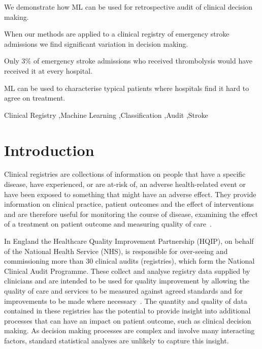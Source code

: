 \documentclass[12pt,a4paper, pdftex]{elsarticle}
\begin{document}
\begin{frontmatter}
\begin{highlights}
\item We demonstrate how ML can be used for retrospective audit of clinical decision making.
\item When our methods are applied to a clinical registry of emergency stroke admissions we find significant variation in decision making.
\item Only 3\% of emergency stroke admissions who received thrombolysis would have received it at every hospital.
\item ML can be used to characterise typical patients where hospitals find it hard to agree on treatment.
\end{highlights}

\begin{keyword}

Clinical Registry \sep Machine Learning \sep Classification \sep Audit \sep Stroke

\end{keyword}

\end{frontmatter}



\section{Introduction}

Clinical registries are collections of information on people that have a specific disease, have experienced, or are at-risk of, an adverse health-related event or have been exposed to something that might have an adverse effect. They provide information on clinical practice, patient outcomes and the effect of interventions and are therefore useful for monitoring the course of disease, examining the effect of a treatment on patient outcome and measuring quality of care~\cite{gliklich2014registries}. 

In England the Healthcare Quality Improvement Partnership (HQIP), on behalf of the National Health Service (NHS), is responsible for over-seeing and commissioning more than 30 clinical audits (registries), which form the National Clinical Audit Programme. These collect and analyse registry data supplied by clinicians and are intended to be used for quality improvement by allowing the quality of care and services to be measured against agreed standards and for improvements to be made where necessary~\cite{burgess2011new}. The quantity and quality of data contained in these registries has the potential to provide insight into additional processes that can have an impact on patient outcome, such as clinical decision making. As decision making processes are complex and involve many interacting factors, standard statistical analyses are unlikely to capture this insight.  
\end{document}

